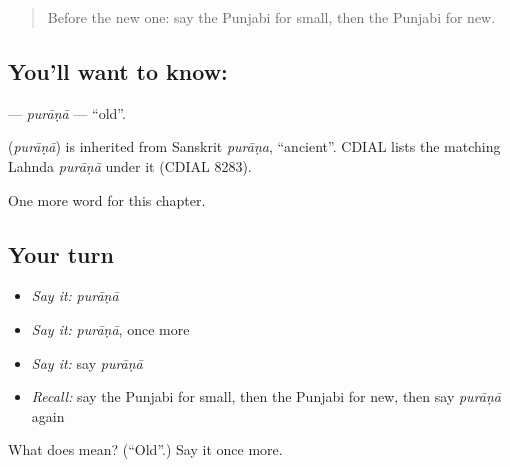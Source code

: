 \label{lesson:PA-C79-purana}



\begin{quote}
Before the new one: say the Punjabi for small, then the Punjabi for new.
\end{quote}

\subsection*{You'll want to know: }
\textbf{} — \emph{purāṇā} — \textquotedblleft{}old\textquotedblright{}.

\begin{cousinweb}
\textbf{} (\emph{purāṇā}) is inherited from Sanskrit \emph{purāṇa}, \textquotedblleft{}ancient\textquotedblright{}. CDIAL lists the matching Lahnda \emph{purāṇā} under it (CDIAL 8283).
\end{cousinweb}

\begin{grammarlens}[title={What you've built}]
One more word for this chapter.
\end{grammarlens}

\subsection*{Your turn}
\begin{itemize}
\raggedright
  \item \emph{Say it:} \emph{purāṇā}
  \item \emph{Say it:} \emph{purāṇā}, once more
  \item \emph{Say it:} say \emph{purāṇā}
  \item \emph{Recall:} say the Punjabi for small, then the Punjabi for new, then say \emph{purāṇā} again
\end{itemize}

\begin{tcolorbox}[breakable,colback=teal!4,colframe=teal!35!black,title={Before you move on}]
What does  mean? (\textquotedblleft{}Old\textquotedblright{}.) Say it once more.
\end{tcolorbox}

